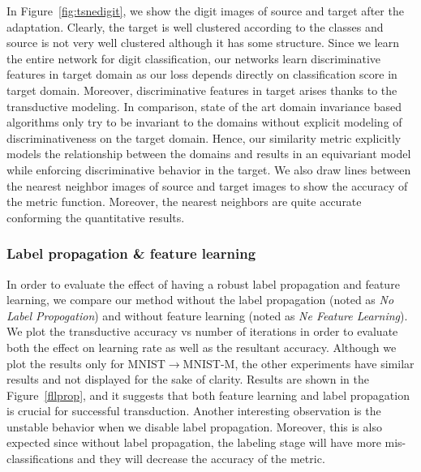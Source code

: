 In Figure~\ref{fig:tsnedigit}, we show the digit images of source and target after the adaptation. Clearly, the target is well clustered according to the classes and source is not very well clustered although it has some structure. Since we learn the entire network for digit classification, our networks learn discriminative features in target domain as our loss depends directly on classification score in target domain. Moreover, discriminative features in target arises thanks to the transductive modeling. In comparison, state of the art domain invariance based algorithms only try to be invariant to the domains without explicit modeling of discriminativeness on the target domain. Hence, our similarity metric explicitly models the relationship between the domains and results in an equivariant model while enforcing discriminative behavior in the target. We also draw lines between the nearest neighbor images of source and target images to show the accuracy of the metric function. Moreover, the nearest neighbors are quite accurate conforming the quantitative results. 

\subsubsection{Label propagation \& feature learning}
In order to evaluate the effect of having a robust label propagation and feature learning, we compare our method without the label propagation (noted as \emph{No Label Propogation}) and without feature learning (noted as \emph{Ne Feature Learning}). We plot the transductive accuracy vs number of iterations in order to evaluate both the effect on learning rate as well as the resultant accuracy. Although we plot the results only for MNIST$\rightarrow$MNIST-M, the other experiments have similar results and not displayed for the sake of clarity.  Results are shown in the Figure~\ref{fllprop}, and it suggests that both feature learning and label propagation is crucial for successful transduction. Another interesting observation is the unstable behavior when we disable label propagation. Moreover, this is also expected since without label propagation, the labeling stage will have more mis-classifications and they will decrease the accuracy of the metric.

